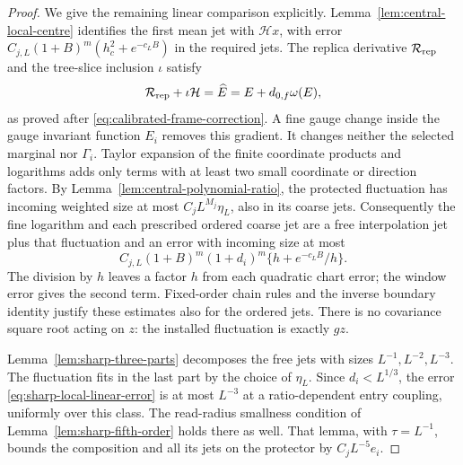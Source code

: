\documentclass[11pt,reqno]{amsart}
\numberwithin{equation}{section}
\theoremstyle{definition}
\theoremstyle{remark}
\begin{document}
\begin{proof}
We give the remaining linear comparison explicitly.
Lemma~\ref{lem:central-local-centre} identifies the first
mean jet with \(\mathcal Hx\), with error
\(C_{j,L}(1+B)^m(h_c^2+e^{-c_LB})\) in the required jets.
The replica derivative \(\mathcal R_{\rm rep}\) and the
tree-slice inclusion \(\iota\) satisfy
\[
 \mathcal R_{\rm rep}+\iota\mathcal H
             =\widehat E=E+d_{0,f}\omega(E),
\]
as proved after \eqref{eq:calibrated-frame-correction}.
A fine gauge change inside the gauge invariant function
\(E_i\) removes this gradient. It changes neither the
selected marginal nor \(\Gamma_i\). Taylor expansion of
the finite coordinate products and logarithms adds only
terms with at least two small coordinate or direction
factors. By Lemma~\ref{lem:central-polynomial-ratio}, the
protected fluctuation has incoming weighted size at most
\(C_jL^{M_j}\eta_L\), also in its coarse jets. Consequently
the fine logarithm and each prescribed ordered coarse jet
are a free interpolation jet plus that fluctuation and
an error with incoming size at most
\begin{equation}
 C_{j,L}(1+B)^m(1+d_i)^m
                       \{h+e^{-c_LB}/h\}.
 \label{eq:sharp-local-linear-error}
\end{equation}
The division by \(h\) leaves a factor \(h\) from each
quadratic chart error; the window error gives the second
term. Fixed-order chain rules and the inverse boundary
identity justify these estimates also for the ordered jets.
There is no covariance square root acting on \(z\): the
installed fluctuation is exactly \(gz\).

Lemma~\ref{lem:sharp-three-parts} decomposes the free jets
with sizes \(L^{-1},L^{-2},L^{-3}\). The fluctuation fits
in the last part by the choice of \(\eta_L\). Since
\(d_i<L^{1/3}\), the error
\eqref{eq:sharp-local-linear-error} is at most \(L^{-3}\)
at a ratio-dependent entry coupling, uniformly over this
class. The read-radius smallness condition of
Lemma~\ref{lem:sharp-fifth-order} holds there as well.
That lemma, with \(\tau=L^{-1}\), bounds the composition
and all its jets on the protector by \(C_jL^{-5}e_i\).


\end{proof}
\end{document}
